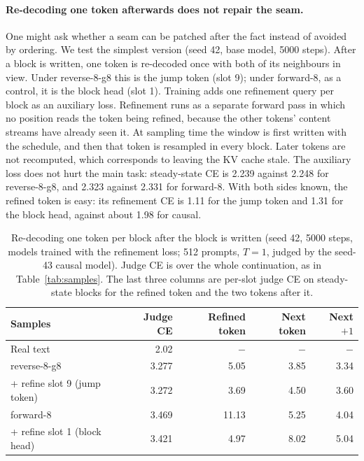 \documentclass[11pt]{article}
\theoremstyle{definition}
\theoremstyle{remark}
\newcommand{\sch}[1]{\textsf{#1}}
\begin{document}
\paragraph{Re-decoding one token afterwards does not repair the seam.}
One might ask whether a seam can be patched after the fact instead of avoided by ordering.
We test the simplest version (seed 42, base model, 5000 steps).
After a block is written, one token is re-decoded once with both of its neighbours in view.
Under \sch{reverse-8-g8} this is the jump token (slot 9); under \sch{forward-8}, as a control, it is the block head (slot 1).
Training adds one refinement query per block as an auxiliary loss.
Refinement runs as a separate forward pass in which no position reads the token being refined, because the other tokens' content streams have already seen it.
At sampling time the window is first written with the schedule, and then that token is resampled in every block.
Later tokens are not recomputed, which corresponds to leaving the KV cache stale.
The auxiliary loss does not hurt the main task: steady-state CE is 2.239 against 2.248 for \sch{reverse-8-g8}, and 2.323 against 2.331 for \sch{forward-8}.
With both sides known, the refined token is easy: its refinement CE is 1.11 for the jump token and 1.31 for the block head, against about 1.98 for causal.

\begin{table}[t]
  \centering
  \caption{Re-decoding one token per block after the block is written (seed 42, 5000 steps, models trained with the refinement loss; 512 prompts, $T=1$, judged by the seed-43 causal model). Judge CE is over the whole continuation, as in Table~\ref{tab:samples}. The last three columns are per-slot judge CE on steady-state blocks for the refined token and the two tokens after it.}
  \label{tab:refine}
  \small
  \begin{tabular}{lrrrr}
    \toprule
    Samples & Judge CE & Refined token & Next token & Next $+1$ \\
    \midrule
    Real text                                   & 2.02  & $-$   & $-$  & $-$  \\
    \sch{reverse-8-g8}                          & 3.277 & 5.05  & 3.85 & 3.34 \\
    \quad + refine slot 9 (jump token)          & 3.272 & 3.69  & 4.50 & 3.60 \\
    \sch{forward-8}                             & 3.469 & 11.13 & 5.25 & 4.04 \\
    \quad + refine slot 1 (block head)          & 3.421 & 4.97  & 8.02 & 5.04 \\
    \bottomrule
  \end{tabular}
\end{table}
\end{document}
